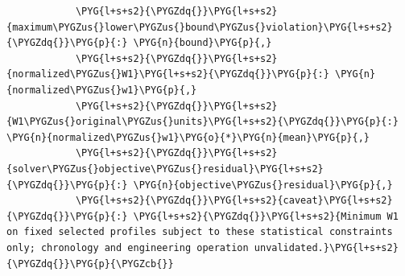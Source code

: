 \begin{Verbatim}
            \PYG{l+s+s2}{\PYGZdq{}}\PYG{l+s+s2}{maximum\PYGZus{}lower\PYGZus{}bound\PYGZus{}violation}\PYG{l+s+s2}{\PYGZdq{}}\PYG{p}{:} \PYG{n}{bound}\PYG{p}{,}
            \PYG{l+s+s2}{\PYGZdq{}}\PYG{l+s+s2}{normalized\PYGZus{}W1}\PYG{l+s+s2}{\PYGZdq{}}\PYG{p}{:} \PYG{n}{normalized\PYGZus{}w1}\PYG{p}{,}
            \PYG{l+s+s2}{\PYGZdq{}}\PYG{l+s+s2}{W1\PYGZus{}original\PYGZus{}units}\PYG{l+s+s2}{\PYGZdq{}}\PYG{p}{:} \PYG{n}{normalized\PYGZus{}w1}\PYG{o}{*}\PYG{n}{mean}\PYG{p}{,}
            \PYG{l+s+s2}{\PYGZdq{}}\PYG{l+s+s2}{solver\PYGZus{}objective\PYGZus{}residual}\PYG{l+s+s2}{\PYGZdq{}}\PYG{p}{:} \PYG{n}{objective\PYGZus{}residual}\PYG{p}{,}
            \PYG{l+s+s2}{\PYGZdq{}}\PYG{l+s+s2}{caveat}\PYG{l+s+s2}{\PYGZdq{}}\PYG{p}{:} \PYG{l+s+s2}{\PYGZdq{}}\PYG{l+s+s2}{Minimum W1 on fixed selected profiles subject to these statistical constraints only; chronology and engineering operation unvalidated.}\PYG{l+s+s2}{\PYGZdq{}}\PYG{p}{\PYGZcb{}}
\end{Verbatim}
